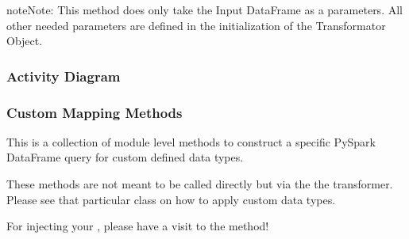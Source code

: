 \documentclass[a4paper,10pt, twoside,english]{sphinxmanual}
\begin{document}
\begin{fulllineitems}
\begin{fulllineitems}
\begin{quote}
\begin{description}
\end{description}\end{quote}

\begin{sphinxadmonition}{note}{Note:}
This method does only take the Input DataFrame as a parameters. All other needed parameters
are defined in the initialization of the Transformator Object.
\end{sphinxadmonition}

\end{fulllineitems}


\end{fulllineitems}



\subsubsection{Activity Diagram}
\label{\detokenize{transformer/mapper:activity-diagram}}
\noindent{}


\subsubsection{Custom Mapping Methods}
\label{\detokenize{transformer/mapper:module-spooq2.transformer.mapper_custom_data_types}}\label{\detokenize{transformer/mapper:custom-mapping-methods}}
This is a collection of module level methods to construct a specific
PySpark DataFrame query for custom defined data types.

These methods are not meant to be called directly but via the
the {\hyperref[\detokenize{transformer/mapper:spooq2.transformer.mapper.Mapper}]{}} transformer.
Please see that particular class on how to apply custom data types.

For injecting your , please have a visit to the
{\hyperref[\detokenize{transformer/mapper:spooq2.transformer.mapper_custom_data_types.add_custom_data_type}]{}} method!
\end{document}
